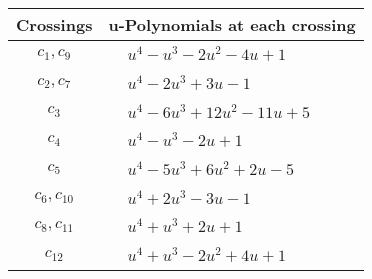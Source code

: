 \documentclass[1p]{elsarticle_modified}
\theoremstyle{definition}
\begin{document}
\begin{tabular}{m{50pt}|m{274pt}}
Crossings & \hspace{64pt}u-Polynomials at each crossing \\
\hline $$\begin{aligned}c_{1},c_{9}\end{aligned}$$&$\begin{aligned}
&u^4- u^3-2 u^2-4 u+1
\end{aligned}$\\
\hline $$\begin{aligned}c_{2},c_{7}\end{aligned}$$&$\begin{aligned}
&u^4-2 u^3+3 u-1
\end{aligned}$\\
\hline $$\begin{aligned}c_{3}\end{aligned}$$&$\begin{aligned}
&u^4-6 u^3+12 u^2-11 u+5
\end{aligned}$\\
\hline $$\begin{aligned}c_{4}\end{aligned}$$&$\begin{aligned}
&u^4- u^3-2 u+1
\end{aligned}$\\
\hline $$\begin{aligned}c_{5}\end{aligned}$$&$\begin{aligned}
&u^4-5 u^3+6 u^2+2 u-5
\end{aligned}$\\
\hline $$\begin{aligned}c_{6},c_{10}\end{aligned}$$&$\begin{aligned}
&u^4+2 u^3-3 u-1
\end{aligned}$\\
\hline $$\begin{aligned}c_{8},c_{11}\end{aligned}$$&$\begin{aligned}
&u^4+u^3+2 u+1
\end{aligned}$\\
\hline $$\begin{aligned}c_{12}\end{aligned}$$&$\begin{aligned}
&u^4+u^3-2 u^2+4 u+1
\end{aligned}$\\
\hline
\end{tabular}\\~\\
\end{document}
